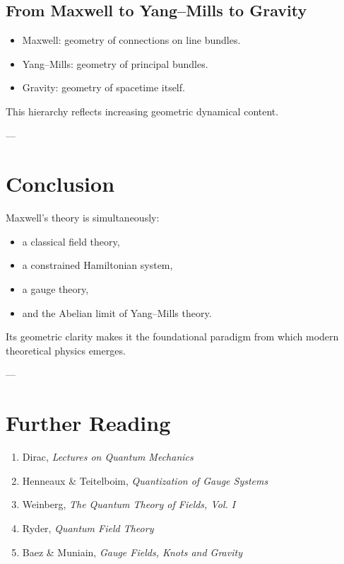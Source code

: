 \documentclass[12pt]{article}
\begin{document}
\subsection{From Maxwell to Yang–Mills to Gravity}

\begin{itemize}
\item Maxwell: geometry of connections on line bundles.
\item Yang–Mills: geometry of principal bundles.
\item Gravity: geometry of spacetime itself.
\end{itemize}

This hierarchy reflects increasing geometric dynamical content.

---

\section{Conclusion}

Maxwell’s theory is simultaneously:
\begin{itemize}
\item a classical field theory,
\item a constrained Hamiltonian system,
\item a gauge theory,
\item and the Abelian limit of Yang–Mills theory.
\end{itemize}

Its geometric clarity makes it the foundational paradigm from which modern theoretical physics emerges.

---

\section*{Further Reading}

\begin{enumerate}
\item Dirac, \textit{Lectures on Quantum Mechanics}
\item Henneaux \& Teitelboim, \textit{Quantization of Gauge Systems}
\item Weinberg, \textit{The Quantum Theory of Fields, Vol. I}
\item Ryder, \textit{Quantum Field Theory}
\item Baez \& Muniain, \textit{Gauge Fields, Knots and Gravity}
\end{enumerate}
\end{document}
